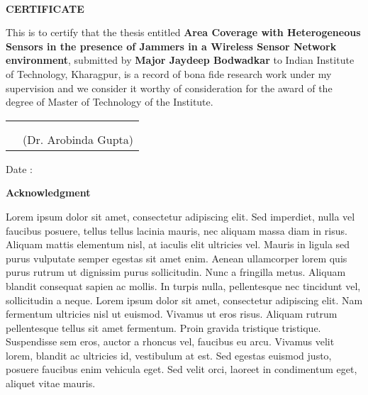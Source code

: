 
\newpage
\thispagestyle{empty}
\cleardoublepage

\newpage
\thispagestyle{empty}
\cleardoublepage

\thispagestyle{empty}
{~} %
\vspace{10em} %
\begin{center}
\textbf{\large CERTIFICATE}
\end{center}
This is to certify that the thesis entitled \textbf{Area Coverage with Heterogeneous Sensors in the presence of Jammers in a Wireless Sensor Network environment}, submitted by \textbf{Major Jaydeep Bodwadkar} to Indian Institute of Technology, Kharagpur, is a record of bona fide research work under my supervision and we consider it worthy of consideration for the award of the degree of Master of Technology of the Institute.
\begin{center}
\begin{tabular*}{\textwidth}{@{\extracolsep{\fill}}cc}
&\\
&\\
& (Dr. Arobinda Gupta)\\
\end{tabular*}
\end{center}
Date :

\newpage
\thispagestyle{empty}
\cleardoublepage


\newpage
\thispagestyle{empty}
\cleardoublepage

\thispagestyle{empty}
\begin{center}
\textbf{\Large Acknowledgment}
\end{center}
Lorem ipsum dolor sit amet, consectetur adipiscing elit. Sed imperdiet, nulla vel faucibus posuere, tellus tellus lacinia mauris, nec aliquam massa diam in risus. Aliquam mattis elementum nisl, at iaculis elit ultricies vel. Mauris in ligula sed purus vulputate semper egestas sit amet enim. Aenean ullamcorper lorem quis purus rutrum ut dignissim purus sollicitudin. Nunc a fringilla metus. Aliquam blandit consequat sapien ac mollis. In turpis nulla, pellentesque nec tincidunt vel, sollicitudin a neque. Lorem ipsum dolor sit amet, consectetur adipiscing elit. Nam fermentum ultricies nisl ut euismod. Vivamus ut eros risus. Aliquam rutrum pellentesque tellus sit amet fermentum. Proin gravida tristique tristique. Suspendisse sem eros, auctor a rhoncus vel, faucibus eu arcu. Vivamus velit lorem, blandit ac ultricies id, vestibulum at est. Sed egestas euismod justo, posuere faucibus enim vehicula eget. Sed velit orci, laoreet in condimentum eget, aliquet vitae mauris.

\newpage
\thispagestyle{empty}
\cleardoublepage
